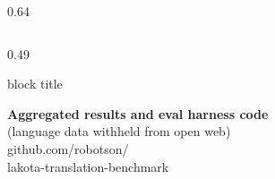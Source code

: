 \documentclass[final]{beamer}
\begin{document}
\begin{frame}[t]
\begin{columns}[t]
\begin{column}{0.64\paperwidth}
\begin{columns}[t]
\begin{column}{0.49\textwidth}
\vspace{6pt}
\begin{beamercolorbox}[wd=\linewidth,sep=14pt]{block title}
\centering
\begin{minipage}{0.38\linewidth}\centering{}\end{minipage}\hfill
\begin{minipage}{0.58\linewidth}\raggedright
{\headfont\bfseries Aggregated results and eval harness code}\\[1pt]
{\footnotesize (language data withheld from open web)}\\[10pt]
{\small github.com/robotson/\\lakota-translation-benchmark}
\end{minipage}
\end{beamercolorbox}
\end{column}
\end{columns}

\end{column}
\end{columns}

\end{frame}
\end{document}
